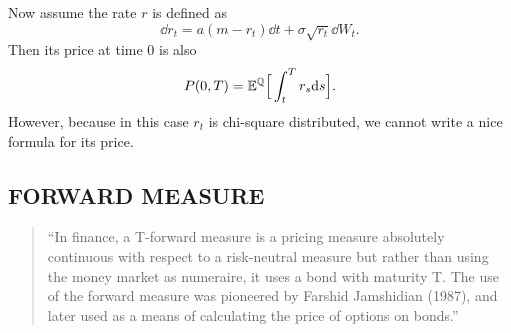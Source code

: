 \begin{example}
	Now assume the rate $r$ is defined as 
	$$\dd r_t = a(m - r_t) \dd t + \sigma \sqrt{r_t} \dd W_t.$$
	Then its price at time $0$ is also
	$$P(0, T) = \mathbb{E}^{\mathbb{Q}} \Big[ \int^T_t r_s \mathrm{d} s  \Big].$$
	However, because in this case $r_t$ is chi-square distributed, we cannot write a nice formula for its price.
\end{example}

\subsection*{FORWARD MEASURE}
\begin{quotation}
	``In finance, a T-forward measure is a pricing measure absolutely continuous with respect to a risk-neutral measure but rather than using the money market as numeraire, it uses a bond with maturity T. The use of the forward measure was pioneered by Farshid Jamshidian (1987), and later used as a means of calculating the price of options on bonds.''
	
\end{quotation}

